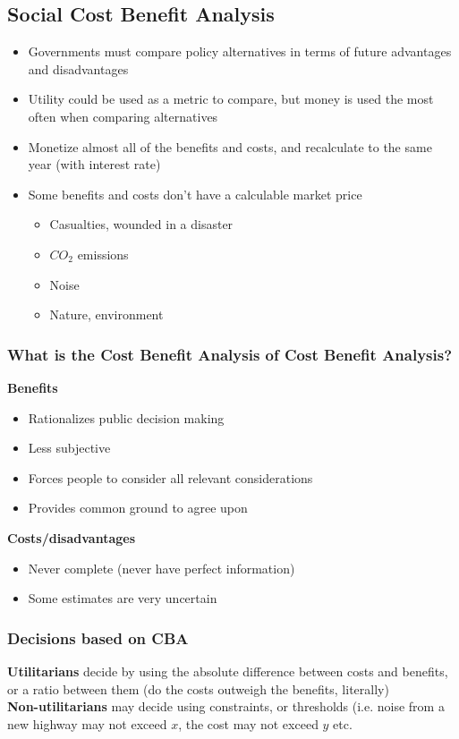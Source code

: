 \documentclass{article}
\begin{document}
    \subsection{Social Cost Benefit Analysis}
    \begin{itemize}
        \item Governments must compare policy alternatives in terms of future advantages and disadvantages
        \item Utility could be used as a metric to compare, but money is used the most often when comparing alternatives
        \item Monetize almost all of the benefits and costs, and recalculate to the same year (with interest rate)
        \item Some benefits and costs don't have a calculable market price
        \begin{itemize}
            \item Casualties, wounded in a disaster
            \item $CO_2$ emissions
            \item Noise
            \item Nature, environment
        \end{itemize}{}
    \end{itemize}{}
        
        \subsubsection{What is the Cost Benefit Analysis of Cost Benefit Analysis?}
        \textbf{Benefits}
        \begin{itemize}
            \item Rationalizes public decision making
            \item Less subjective
            \item Forces people to consider all relevant considerations
            \item Provides common ground to agree upon
        \end{itemize}
        \textbf{Costs/disadvantages}
        \begin{itemize}
            \item Never complete (never have perfect information)
            \item Some estimates are very uncertain
        \end{itemize}{}
        
        \subsubsection{Decisions based on CBA}
        \textbf{Utilitarians} decide by using the absolute difference between costs and benefits, or a ratio between them (do the costs outweigh the benefits, literally)
        \\\textbf{Non-utilitarians} may decide using constraints, or thresholds (i.e. noise from a new highway may not exceed $x$, the cost may not exceed $y$ etc.
        
\end{document}
